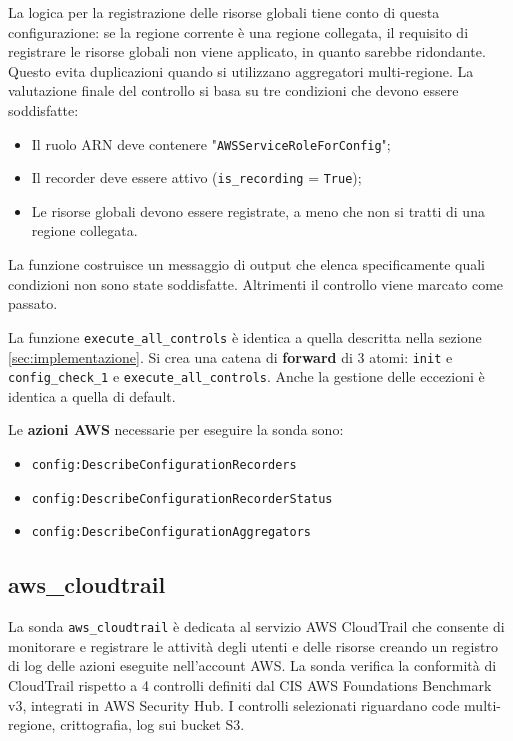 La logica per la registrazione delle risorse globali tiene conto di questa configurazione: se la regione corrente è una regione collegata, il requisito di registrare le risorse globali non viene applicato, in quanto sarebbe ridondante. Questo evita duplicazioni quando si utilizzano aggregatori multi-regione. La valutazione finale del controllo si basa su tre condizioni che devono essere soddisfatte:

\begin{itemize}
\item Il ruolo ARN deve contenere "\texttt{AWSServiceRoleForConfig}";
\item Il recorder deve essere attivo (\texttt{is\_recording} = \texttt{True});
\item Le risorse globali devono essere registrate, a meno che non si tratti di una regione collegata.
\end{itemize}

La funzione costruisce un messaggio di output che elenca specificamente quali condizioni non sono state soddisfatte. Altrimenti il controllo viene marcato come passato. 

La funzione \texttt{execute\_all\_controls} è identica a quella descritta nella sezione \ref{sec:implementazione}. Si crea una catena di \textbf{forward} di 3 atomi: \texttt{init} e \texttt{config\_check\_1} e \texttt{execute\_all\_controls}. Anche la gestione delle eccezioni è identica a quella di default.

Le \textbf{azioni AWS} necessarie per eseguire la sonda sono:
\begin{itemize}
    \item \texttt{config:DescribeConfigurationRecorders}
    \item \texttt{config:DescribeConfigurationRecorderStatus}
    \item \texttt{config:DescribeConfigurationAggregators}
\end{itemize}

\subsection{aws\_cloudtrail}
\label{sec:cloudtrail}

La sonda \texttt{aws\_cloudtrail} è dedicata al servizio AWS CloudTrail che consente di monitorare e registrare le attività degli utenti e delle risorse creando un registro di log delle azioni eseguite nell'account AWS. La sonda verifica la conformità di CloudTrail rispetto a 4 controlli definiti dal CIS AWS Foundations Benchmark v3, integrati in AWS Security Hub. I controlli selezionati riguardano code multi-regione, crittografia, log sui bucket S3.

